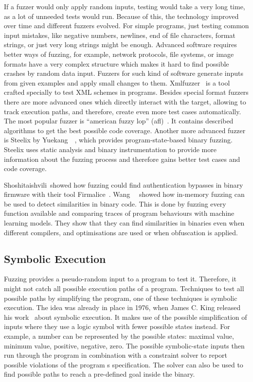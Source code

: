 If a fuzzer would only apply random inputs, testing would take a very long
time, as a lot of unneeded tests would run. Because of this, the technology
improved over time and different fuzzers evolved. For simple programs, just
testing common input mistakes, like negative numbers, newlines, end of file
characters, format strings, or just very long strings might be enough. Advanced
software requires better ways of fuzzing, for example, network protocols, file
systems, or image formats have a very complex structure which makes it hard to
find possible crashes by random data input. Fuzzers for such kind of software
generate inputs from given examples and apply small changes to them.
Xmlfuzzer~\cite{xmlfuzzer} is a tool crafted specially to test XML schemes in
programs. Besides special format fuzzers there are more advanced ones which
directly interact with the target, allowing to track execution paths, and
therefore, create even more test cases automatically. The most popular fuzzer is
``american fuzzy lop'' (afl)~\cite{aflweb}. It contains described algorithms to
get the best possible code coverage. Another more advanced fuzzer is Steelix by
Yuekang~\etal~\cite{steelix}, which provides program-state-based binary fuzzing.
Steelix uses static analysis and binary instrumentation to provide more
information about the fuzzing process and therefore gains better test cases and
code coverage.

Shoshitaishvili~\etal showed how fuzzing could find authentication bypasses in
binary firmware with their tool Firmalice~\cite{firmalice}.
Wang~\etal~\cite{inmemfuzzing} showed how in-memory fuzzing can be used to detect
similarities in binary code. This is done by fuzzing every function available
and comparing traces of program behaviours with machine learning models. They
show that they can find similarities in binaries even when different compilers,
and optimisations are used or when obfuscation is applied.

\subsection{Symbolic Execution}

Fuzzing provides a pseudo-random input to a program to test it. Therefore, it
might not catch all possible execution paths of a program. Techniques to test
all possible paths by simplifying the program, one of these techniques is
symbolic execution. The idea was already in place in 1976, when James C. King
released his work~\cite{symbolexechist} about symbolic execution. It makes use
of the possible simplification of inputs where they use a logic symbol with
fewer possible states instead. For example, a number can be represented by the
possible states: maximal value, minimum value, positive, negative, zero. The
possible symbolic-state inputs then run through the program in combination with
a constraint solver to report possible violations of the program\textquotesingle
s specification. The solver can also be used to find possible paths to reach a
pre-defined goal inside the binary.

